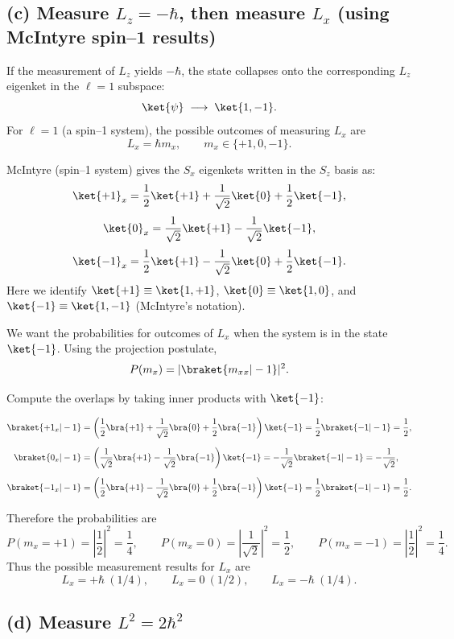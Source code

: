 \documentclass{article}
\begin{document}
\subsection*{(c) Measure $L_z=-\hbar$, then measure $L_x$ (using McIntyre spin--1 results)}

If the measurement of $L_z$ yields $-\hbar$, the state collapses onto the corresponding
$L_z$ eigenket in the $\ell=1$ subspace:
\[
\ket{\psi}\;\longrightarrow\;\ket{1,-1}.
\]
For $\ell=1$ (a spin--1 system), the possible outcomes of measuring $L_x$ are
\[
L_x = \hbar m_x,\qquad m_x\in\{+1,0,-1\}.
\]

McIntyre (spin--1 system) gives the $S_x$ eigenkets written in the $S_z$ basis as:
\[
\ket{+1}_x = \frac{1}{2}\ket{+1}+\frac{1}{\sqrt2}\ket{0}+\frac{1}{2}\ket{-1},
\]
\[
\ket{0}_x = \frac{1}{\sqrt2}\ket{+1}-\frac{1}{\sqrt2}\ket{-1},
\]
\[
\ket{-1}_x = \frac{1}{2}\ket{+1}-\frac{1}{\sqrt2}\ket{0}+\frac{1}{2}\ket{-1}.
\]
Here we identify $\ket{+1}\equiv\ket{1,+1}$, $\ket{0}\equiv\ket{1,0}$, and
$\ket{-1}\equiv\ket{1,-1}$ (McIntyre's notation).

We want the probabilities for outcomes of $L_x$ when the system is in the state $\ket{-1}$.
Using the projection postulate,
\[
P(m_x)=|\braket{m_x{}_x|-1}|^2.
\]

Compute the overlaps by taking inner products with $\ket{-1}$:

\begin{align*}
\braket{+1_x|-1}
&=
\left(\frac{1}{2}\bra{+1}+\frac{1}{\sqrt2}\bra{0}+\frac{1}{2}\bra{-1}\right)\ket{-1}
= \frac{1}{2}\braket{-1|-1}
= \frac{1}{2},\\[6pt]
\braket{0_x|-1}
&=
\left(\frac{1}{\sqrt2}\bra{+1}-\frac{1}{\sqrt2}\bra{-1}\right)\ket{-1}
= -\frac{1}{\sqrt2}\braket{-1|-1}
= -\frac{1}{\sqrt2},\\[6pt]
\braket{-1_x|-1}
&=
\left(\frac{1}{2}\bra{+1}-\frac{1}{\sqrt2}\bra{0}+\frac{1}{2}\bra{-1}\right)\ket{-1}
= \frac{1}{2}\braket{-1|-1}
= \frac{1}{2}.
\end{align*}

Therefore the probabilities are
\[
P(m_x=+1)=\left|\frac{1}{2}\right|^2=\frac{1}{4},\qquad
P(m_x=0)=\left|\frac{1}{\sqrt2}\right|^2=\frac{1}{2},\qquad
P(m_x=-1)=\left|\frac{1}{2}\right|^2=\frac{1}{4}.
\]
Thus the possible measurement results for $L_x$ are
\[
\boxed{
L_x=+\hbar\ (1/4),\qquad
L_x=0\ (1/2),\qquad
L_x=-\hbar\ (1/4).
}
\]

\newpage

\subsection*{(d) Measure $L^2=2\hbar^2$}
\end{document}
